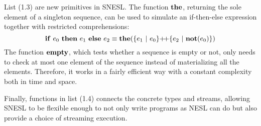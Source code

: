 List (1.3) are new primitives in SNESL.  
The function $\mathbf{the}$, returning the sole element of a singleton sequence, can be used to simulate an if-then-else expression together with restricted comprehensions:
$$\*{if} \ e_0 \ \*{then} \ e_1 \ \*{else} \ e_2 \equiv \*{the}(\{e_1 \ | \ e_0 \} {\++} \{e_2 \ | \ \*{not}(e_0)\}) $$
The function $\mathbf{empty}$, which tests whether a sequence is empty or not, only needs to check at most one element of the sequence instead of materializing all the elements. Therefore, it works in a fairly efficient way with a constant complexity both in time and space.

Finally, functions in list (1.4) connects the concrete types and streams, allowing SNESL to be flexible enough to not only write programs as NESL can do but also provide a choice of streaming execution. 

